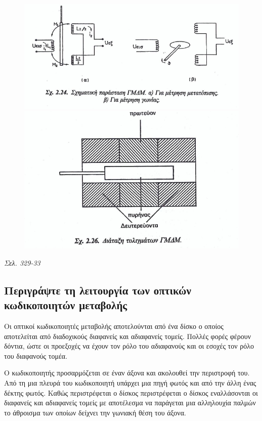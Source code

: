 \documentclass{article}
\begin{document}
\begin{figure}[h!]
    \includegraphics[width=\linewidth]{GMDM1.png}
    \includegraphics[width=\linewidth]{GMDM2.png}
\end{figure}
\emph{Σελ. 329-33}

\subsection{Περιγράψτε τη λειτουργία των οπτικών κωδικοποιητών μεταβολής}
Οι οπτικοί κωδικοποιητές μεταβολής αποτελούνται από ένα δίσκο ο οποίος αποτελείται από διαδοχικούς διαφανείς και αδιαφανείς τομείς. Πολλές φορές φέρουν δόντια, ώστε οι
προεξοχές να έχουν τον ρόλο του αδιαφανούς και οι εσοχές τον ρόλο του διαφανούς τομέα. 

Ο κωδικοποιητής προσαρμόζεται σε έναν άξονα και ακολουθεί την περιστροφή του. Από τη μια πλευρά του κωδικοποιητή υπάρχει μια πηγή φωτός και από την άλλη ένας δέκτης φωτός.
Καθώς περιστρέφεται ο δίσκος περιστρέφεται ο δίσκος εναλλάσονται οι διαφανείς και αδιαφανείς τομείς με αποτέλεσμα να παράγεται μια αλληλουχία παλμών το άθροισμα των οποίων 
δείχνει την γωνιακή θέση του άξονα. 
\end{document}
